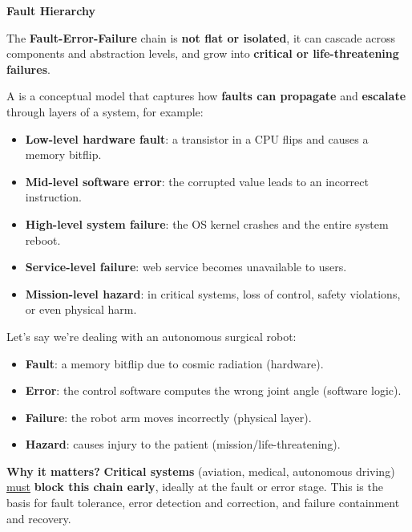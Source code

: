 \begin{flushleft}
    \textcolor{Red2}{ \textbf{Fault Hierarchy}}
\end{flushleft}
The \textbf{Fault-Error-Failure} chain is \textbf{not flat or isolated}, it can cascade across components and abstraction levels, and grow into \textbf{critical or life-threatening failures}.

\highspace
A  is a conceptual model that captures how \textbf{faults can propagate} and \textbf{escalate} through layers of a system, for example:
\begin{itemize}
    \item \textbf{Low-level hardware fault}: a transistor in a CPU flips and causes a memory bitflip.
    \item \textbf{Mid-level software error}: the corrupted value leads to an incorrect instruction.
    \item \textbf{High-level system failure}: the OS kernel crashes and the entire system reboot.
    \item \textbf{Service-level failure}: web service becomes unavailable to users.
    \item \textbf{Mission-level hazard}: in critical systems, loss of control, safety violations, or even physical harm.
\end{itemize}

\highspace
\begin{examplebox}
    Let's say we're dealing with an autonomous surgical robot:
    \begin{itemize}
        \item \textbf{Fault}: a memory bitflip due to cosmic radiation (hardware).
        \item \textbf{Error}: the control software computes the wrong joint angle (software logic).
        \item \textbf{Failure}: the robot arm moves incorrectly (physical layer).
        \item \textbf{Hazard}: causes injury to the patient (mission/life-threatening).
    \end{itemize}
\end{examplebox}

\highspace
\textcolor{Green3}{ \textbf{Why it matters?}} \textbf{Critical systems} (aviation, medical, autonomous driving) \underline{must} \textbf{block this chain early}, ideally at the fault or error stage. This is the basis for fault tolerance, error detection and correction, and failure containment and recovery.

